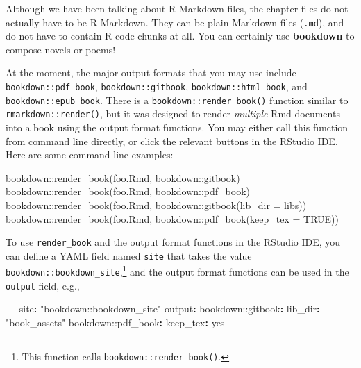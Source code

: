 \documentclass[
]{book}
\newenvironment{Shaded}{\begin{snugshade}}{\end{snugshade}}
\newcommand{\AttributeTok}[1]{\textcolor[rgb]{0.77,0.63,0.00}{#1}}
\newcommand{\CharTok}[1]{\textcolor[rgb]{0.31,0.60,0.02}{#1}}
\newcommand{\ConstantTok}[1]{\textcolor[rgb]{0.00,0.00,0.00}{#1}}
\newcommand{\FunctionTok}[1]{\textcolor[rgb]{0.00,0.00,0.00}{#1}}
\newcommand{\KeywordTok}[1]{\textcolor[rgb]{0.13,0.29,0.53}{\textbf{#1}}}
\newcommand{\NormalTok}[1]{#1}
\newcommand{\PreprocessorTok}[1]{\textcolor[rgb]{0.56,0.35,0.01}{\textit{#1}}}
\newcommand{\SpecialCharTok}[1]{\textcolor[rgb]{0.00,0.00,0.00}{#1}}
\newcommand{\StringTok}[1]{\textcolor[rgb]{0.31,0.60,0.02}{#1}}
\begin{document}
Although we have been talking about R Markdown files, the chapter files do not actually have to be R Markdown. They can be plain Markdown files (\texttt{.md}), and do not have to contain R code chunks at all. You can certainly use \textbf{bookdown} to compose novels or poems!

At the moment, the major output formats that you may use include \texttt{bookdown::pdf\_book}, \texttt{bookdown::gitbook}, \texttt{bookdown::html\_book}, and \texttt{bookdown::epub\_book}. There is a \texttt{bookdown::render\_book()} function similar to \texttt{rmarkdown::render()}, but it was designed to render \emph{multiple} Rmd documents into a book using the output format functions. You may either call this function from command line directly, or click the relevant buttons in the RStudio IDE. Here are some command-line examples:

\begin{Shaded}
\begin{Highlighting}[]
\NormalTok{bookdown}\SpecialCharTok{::}\FunctionTok{render\_book}\NormalTok{(}\StringTok{\textquotesingle{}foo.Rmd\textquotesingle{}}\NormalTok{, }\StringTok{\textquotesingle{}bookdown::gitbook\textquotesingle{}}\NormalTok{)}
\NormalTok{bookdown}\SpecialCharTok{::}\FunctionTok{render\_book}\NormalTok{(}\StringTok{\textquotesingle{}foo.Rmd\textquotesingle{}}\NormalTok{, }\StringTok{\textquotesingle{}bookdown::pdf\_book\textquotesingle{}}\NormalTok{)}
\NormalTok{bookdown}\SpecialCharTok{::}\FunctionTok{render\_book}\NormalTok{(}\StringTok{\textquotesingle{}foo.Rmd\textquotesingle{}}\NormalTok{, bookdown}\SpecialCharTok{::}\FunctionTok{gitbook}\NormalTok{(}\AttributeTok{lib\_dir =} \StringTok{\textquotesingle{}libs\textquotesingle{}}\NormalTok{))}
\NormalTok{bookdown}\SpecialCharTok{::}\FunctionTok{render\_book}\NormalTok{(}\StringTok{\textquotesingle{}foo.Rmd\textquotesingle{}}\NormalTok{, bookdown}\SpecialCharTok{::}\FunctionTok{pdf\_book}\NormalTok{(}\AttributeTok{keep\_tex =} \ConstantTok{TRUE}\NormalTok{))}
\end{Highlighting}
\end{Shaded}

To use \texttt{render\_book} and the output format functions in the RStudio IDE, you can define a YAML field named \texttt{site} that takes the value \texttt{bookdown::bookdown\_site},\footnote{This function calls \texttt{bookdown::render\_book()}.} and the output format functions can be used in the \texttt{output} field, e.g.,

\begin{Shaded}
\begin{Highlighting}[]
\PreprocessorTok{{-}{-}{-}}
\FunctionTok{site}\KeywordTok{:}\AttributeTok{ }\StringTok{"bookdown::bookdown\_site"}
\FunctionTok{output}\KeywordTok{:}
\AttributeTok{  bookdown:}\FunctionTok{:gitbook}\KeywordTok{:}
\AttributeTok{    }\FunctionTok{lib\_dir}\KeywordTok{:}\AttributeTok{ }\StringTok{"book\_assets"}
\AttributeTok{  bookdown:}\FunctionTok{:pdf\_book}\KeywordTok{:}
\AttributeTok{    }\FunctionTok{keep\_tex}\KeywordTok{:}\AttributeTok{ }\CharTok{yes}
\PreprocessorTok{{-}{-}{-}}
\end{Highlighting}
\end{Shaded}
\end{document}
